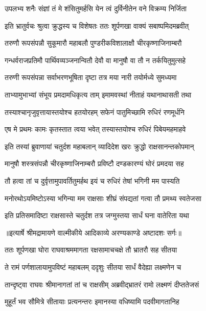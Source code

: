 \twolineshloka
{उपलभ्य शनैः संज्ञां तं मे शंसितुमर्हसि}
{येन त्वं दुर्विनीतेन वने विक्रम्य निर्जिता} %

\twolineshloka
{इति भ्रातुर्वचः श्रुत्वा क्रुद्धस्य च विशेषतः}
{ततः शूर्पणखा वाक्यं सबाष्पमिदमब्रवीत्} %

\twolineshloka
{तरुणौ रूपसंपन्नौ सुकूमारौ महाबलौ}
{पुण्डरीकविशालाक्षौ चीरकृष्णाजिनाम्बरौ} %

\twolineshloka
{गन्धर्वराजप्रतिमौ पार्थिवव्यञ्जनान्वितौ}
{देवौ वा मानुषौ वा तौ न तर्कयितुमुत्सहे} %

\twolineshloka
{तरुणी रूपसंपन्ना सर्वाभरणभूषिता}
{दृष्टा तत्र मया नारी तयोर्मध्ये सुमध्यमा} %

\twolineshloka
{ताभ्यामुभाभ्यां संभूय प्रमदामधिकृत्य ताम्}
{इमामवस्थां नीताहं यथानाथासती तथा} %

\twolineshloka
{तस्याश्चानृजुवृत्तायास्तयोश्च हतयोरहम्}
{सफेनं पातुमिच्छामि रुधिरं रणमूर्धनि} %

\twolineshloka
{एष मे प्रथमः कामः कृतस्तात त्वया भवेत्}
{तस्यास्तयोश्च रुधिरं पिबेयमहमाहवे} %

\twolineshloka
{इति तस्यां ब्रुवाणायां चतुर्दश महाबलान्}
{व्यादिदेश खरः क्रुद्धो राक्षसानन्तकोपमान्} %

\twolineshloka
{मानुषौ शस्त्रसंपन्नौ चीरकृष्णाजिनाम्बरौ}
{प्रविष्टौ दण्डकारण्यं घोरं प्रमदया सह} %

\twolineshloka
{तौ हत्वा तां च दुर्वृत्तामुपावर्तितुमर्हथ}
{इयं च रुधिरं तेषां भगिनी मम पास्यति} %

\twolineshloka
{मनोरथोऽयमिष्टोऽस्या भगिन्या मम राक्षसाः}
{शीघ्रं संपद्यतां गत्वा तौ प्रमथ्य स्वतेजसा} %

\twolineshloka
{इति प्रतिसमादिष्टा राक्षसास्ते चतुर्दश}
{तत्र जग्मुस्तया सार्धं घना वातेरिता यथा} %


{॥इत्यार्षे श्रीमद्रामायणे वाल्मीकीये आदिकाव्ये अरण्यकाण्डे अष्टादशः सर्गः॥}


\twolineshloka
{ततः शूर्पणखा घोरा राघवाश्रममागता}
{रक्षसामाचचक्षे तौ भ्रातरौ सह सीतया} %

\twolineshloka
{ते रामं पर्णशालायामुपविष्टं महाबलम्}
{ददृशुः सीतया सार्धं वैदेह्या लक्ष्मणेन च} %

\twolineshloka
{तान्दृष्ट्वा राघवः श्रीमानागतां तां च राक्षसीम्}
{अब्रवीद्भ्रातरं रामो लक्ष्मणं दीप्ततेजसं} %

\twolineshloka
{मुहूर्तं भव सौमित्रे सीतायाः प्रत्यनन्तरः}
{इमानस्या वधिष्यामि पदवीमागतानिह} %

